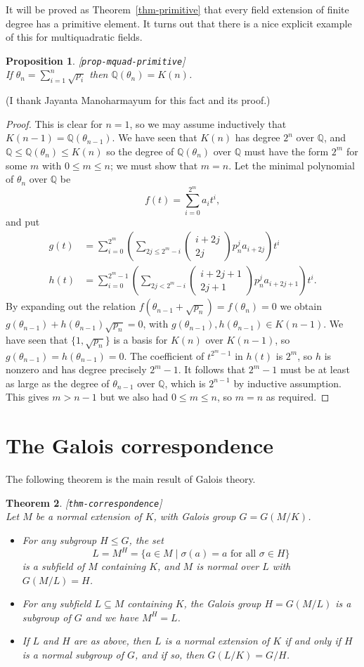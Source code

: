\documentclass{amsart}
\newcommand{\lbl}[1]{\label{#1}\textup{[\texttt{#1}]}\ \\}
\newcommand{\lbl}{\label}
\newcommand{\Q}         {{\mathbb{Q}}}
\newcommand{\tht}       {\theta}
\newcommand{\sg}        {\sigma}
\newcommand{\st}        {\;|\;}
\newcommand{\sse}       {\subseteq}
\newcommand{\bcf}[2]{\left(\begin{array}{c}{#1}\\{#2}\end{array}\right)}
\renewcommand{\:}{\colon}
\newtheorem{theorem}{Theorem}[section]
\newtheorem{proposition}[theorem]{Proposition}
\theoremstyle{definition}
\begin{document}
It will be proved as Theorem~\ref{thm-primitive} that every field
extension of finite degree has a primitive element.  It turns out that
there is a nice explicit example of this for multiquadratic fields.
\begin{proposition}\lbl{prop-mquad-primitive}
 If $\tht_n=\sum_{i=1}^n\sqrt{p_i}$ then $\Q(\tht_n)=K(n)$.
\end{proposition}
(I thank Jayanta Manoharmayum for this fact and its proof.)
\begin{proof}
 This is clear for $n=1$, so we may assume inductively that
 $K(n-1)=\Q(\tht_{n-1})$.  We have seen that $K(n)$ has degree $2^n$
 over $\Q$, and $\Q\leq\Q(\tht_n)\leq K(n)$ so the degree of
 $\Q(\tht_n)$ over $\Q$ must have the form $2^m$ for some $m$ with
 $0\leq m\leq n$; we must show that $m=n$.  Let the minimal polynomial
 of $\tht_n$ over $\Q$ be
 \[ f(t) = \sum_{i=0}^{2^m} a_i t^i, \]
 and put 
 \begin{align*}
  g(t) &= \sum_{i=0}^{2^m}
           \left(\sum_{2j\leq 2^m-i} \bcf{i+2j}{2j}p_n^ja_{i+2j}\right) t^i \\
  h(t) &= \sum_{i=0}^{2^m-1}
           \left(\sum_{2j<2^m-i} \bcf{i+2j+1}{2j+1}p_n^ja_{i+2j+1}\right) t^i.
 \end{align*}
 By expanding out the relation $f(\tht_{n-1}+\sqrt{p_n})=f(\tht_n)=0$
 we obtain $g(\tht_{n-1})+h(\tht_{n-1})\sqrt{p_n}=0$, with
 $g(\tht_{n-1}), h(\tht_{n-1})\in K(n-1)$.  We have seen that
 $\{1,\sqrt{p_n}\}$ is a basis for $K(n)$ over $K(n-1)$, so
 $g(\tht_{n-1})=h(\tht_{n-1})=0$.  The coefficient of $t^{2^m-1}$ in
 $h(t)$ is $2^m$, so $h$ is nonzero and has degree precisely $2^m-1$.
 It follows that $2^m-1$ must be at least as large as the degree of
 $\tht_{n-1}$ over $\Q$, which is $2^{n-1}$ by inductive assumption.
 This gives $m>n-1$ but we also had $0\leq m\leq n$, so $m=n$ as required.
\end{proof}


\section{The Galois correspondence}
\label{sec-correspondence}

The following theorem is the main result of Galois theory.
\begin{theorem}\lbl{thm-correspondence}
 Let $M$ be a normal extension of $K$, with Galois group $G=G(M/K)$.
 \begin{itemize}
  \item[(a)] For any subgroup $H\leq G$, the set
   \[ L=M^H=\{a\in M\st \sg(a)=a\text{ for all } \sg\in H\} \]
   is a subfield of $M$ containing $K$, and $M$ is normal over $L$
   with $G(M/L)=H$.
  \item[(b)] For any subfield $L\sse M$ containing $K$, the Galois
   group $H=G(M/L)$ is a subgroup of $G$ and we have $M^H=L$.
  \item[(c)] If $L$ and $H$ are as above, then $L$ is a normal
   extension of $K$ if and only if $H$ is a normal subgroup of $G$,
   and if so, then $G(L/K)=G/H$.
 \end{itemize}
\end{theorem}
\end{document}

